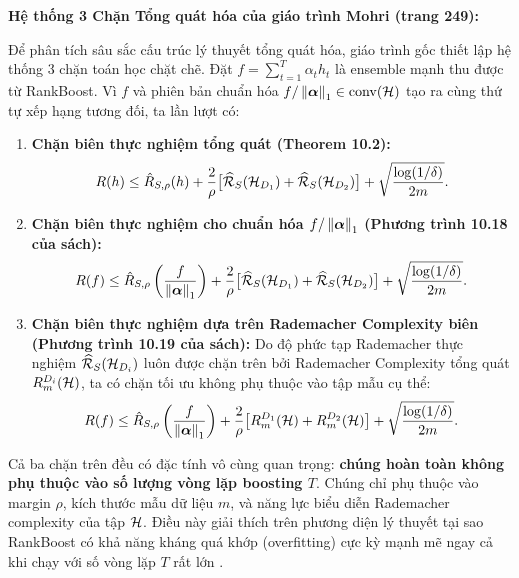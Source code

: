 \textbf{Hệ thống 3 Chặn Tổng quát hóa của giáo trình Mohri (trang 249):}

Để phân tích sâu sắc cấu trúc lý thuyết tổng quát hóa, giáo trình gốc \citep{mohri2018foundations} thiết lập hệ thống 3 chặn toán học chặt chẽ. Đặt $f = \sum_{t=1}^T \alpha_t h_t$ là ensemble mạnh thu được từ RankBoost. Vì $f$ và phiên bản chuẩn hóa $f/\left\lVert \bm{\alpha} \right\rVert_1 \in \operatorname{conv}(\mathcal{H})$ tạo ra cùng thứ tự xếp hạng tương đối, ta lần lượt có:

\begin{enumerate}
    \item \textbf{Chặn biên thực nghiệm tổng quát (Theorem 10.2):}
    \begin{equation}
        R(h) \leq \hat{R}_{S,\rho}(h) + \frac{2}{\rho}\bigl[\widehat{\mathcal{R}}_S(\mathcal{H}_{D_1}) + \widehat{\mathcal{R}}_S(\mathcal{H}_{D_2})\bigr] + \sqrt{\frac{\log(1/\delta)}{2m}}.
        \label{eq:bound_thm_10_2}
    \end{equation}

    \item \textbf{Chặn biên thực nghiệm cho chuẩn hóa $f/\left\lVert \bm{\alpha} \right\rVert_1$ (Phương trình 10.18 của sách):}
    \begin{equation}
        R(f) \leq \hat{R}_{S,\rho}\left(\frac{f}{\left\lVert \bm{\alpha} \right\rVert_1}\right) + \frac{2}{\rho}\bigl[\widehat{\mathcal{R}}_S(\mathcal{H}_{D_1}) + \widehat{\mathcal{R}}_S(\mathcal{H}_{D_2})\bigr] + \sqrt{\frac{\log(1/\delta)}{2m}}.
        \label{eq:bound_10_18}
    \end{equation}

    \item \textbf{Chặn biên thực nghiệm dựa trên Rademacher Complexity biên (Phương trình 10.19 của sách):}
    Do độ phức tạp Rademacher thực nghiệm $\widehat{\mathcal{R}}_S(\mathcal{H}_{D_i})$ luôn được chặn trên bởi Rademacher Complexity tổng quát $R^{D_i}_m(\mathcal{H})$, ta có chặn tối ưu không phụ thuộc vào tập mẫu cụ thể:
    \begin{equation}
        R(f) \leq \hat{R}_{S,\rho}\left(\frac{f}{\left\lVert \bm{\alpha} \right\rVert_1}\right) + \frac{2}{\rho}\bigl[R^{D_1}_m(\mathcal{H}) + R^{D_2}_m(\mathcal{H})\bigr] + \sqrt{\frac{\log(1/\delta)}{2m}}.
        \label{eq:bound_10_19}
    \end{equation}
\end{enumerate}

\begin{tcolorbox}[enhanced, breakable, colback=blue!5, colframe=blue!50!black, title={\textbf{Quan sát then chốt}}]
Cả ba chặn trên đều có đặc tính vô cùng quan trọng: \textbf{chúng hoàn toàn không phụ thuộc vào số lượng vòng lặp boosting $T$}. Chúng chỉ phụ thuộc vào margin $\rho$, kích thước mẫu dữ liệu $m$, và năng lực biểu diễn Rademacher complexity của tập $\mathcal{H}$. Điều này giải thích trên phương diện lý thuyết tại sao RankBoost có khả năng kháng quá khớp (overfitting) cực kỳ mạnh mẽ ngay cả khi chạy với số vòng lặp $T$ rất lớn \citep{rudin2005margin}.
\end{tcolorbox}

